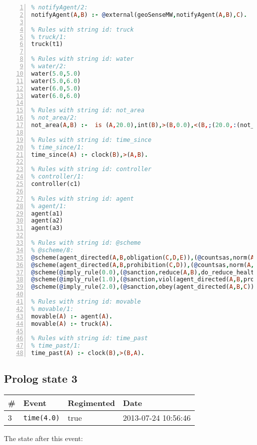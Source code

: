 \documentclass[11pt]{article}\usepackage[utf8]{inputenc}\usepackage{geometry}
\begin{document}
\begin{lstlisting}[language=Prolog, numbers=left]
% Rules with string id: notifyAgent
% notifyAgent/2:
notifyAgent(A,B) :- @external(geoSenseMW,notifyAgent(A,B),C).

% Rules with string id: truck
% truck/1:
truck(t1)

% Rules with string id: water
% water/2:
water(5.0,5.0)
water(5.0,6.0)
water(6.0,5.0)
water(6.0,6.0)

% Rules with string id: not_area
% not_area/2:
not_area(A,B) :-  is (A,20.0),int(B),>(B,0.0),<(B,;(20.0,:(not_area(A,B), is (-(B),20.0)))),int(A),>(A,0.0),<(A,;(20.0,:(area(A,B),-(int(A))))),int(B),>(A,0.0),>(B,0.0),<(A,21.0),<(B,21.0).

% Rules with string id: time_since
% time_since/1:
time_since(A) :- clock(B),>(A,B).

% Rules with string id: controller
% controller/1:
controller(c1)

% Rules with string id: agent
% agent/1:
agent(a1)
agent(a2)
agent(a3)

% Rules with string id: @scheme
% @scheme/8:
@scheme(agent_directed(A,B,obligation(C,D,E)),(@countsas,norm(A,B,F,obligation(C,D,E)),F),false,(listTrue(C)),(time_past(D)),false,[plus(viol(agent_directed(A,B,obligation(C,D,E))))|[]],[plus(obey(agent_directed(A,B,obligation(C,D,E))))|[]])
@scheme(agent_directed(A,B,prohibition(C,D)),(@countsas,norm(A,B,E,prohibition(C,D)),E),(listTrue(C)),false,(false),false,[plus(viol(agent_directed(A,B,prohibition(C,D))))|[]],[plus(obey(agent_directed(A,B,prohibition(C,D))))|[]])
@scheme(@imply_rule(0.0),(@sanction,reduce(A,B),do_reduce_health(A,B),notifyAgent(A,changed(status))),true,false,false,false,[min(reduce(A,B))|[]],[])
@scheme(@imply_rule(1.0),(@sanction,viol(agent_directed(A,B,prohibition(C,D))),do_sanction(D)),true,false,false,false,[min(viol(agent_directed(A,B,prohibition(C,D))))|[]],[])
@scheme(@imply_rule(2.0),(@sanction,obey(agent_directed(A,B,C))),true,false,false,false,[min(obey(agent_directed(A,B,C)))|[]],[])

% Rules with string id: movable
% movable/1:
movable(A) :- agent(A).
movable(A) :- truck(A).

% Rules with string id: time_past
% time_past/1:
time_past(A) :- clock(B),>(B,A).

\end{lstlisting}
\clearpage 
\subsection{Prolog state 3}
\begin{table}[ht]
\centering 
\begin{tabular}{l l l l} 
\textbf{\#} & \textbf{Event} & \textbf{Regimented} & \textbf{Date} \\ [0.5ex] 
\hline
3&\texttt{time(4.0)}&true&2013-07-24 10:56:46\\ [1ex] \hline\end{tabular}
\end{table}
The state after this event:
\end{document}
